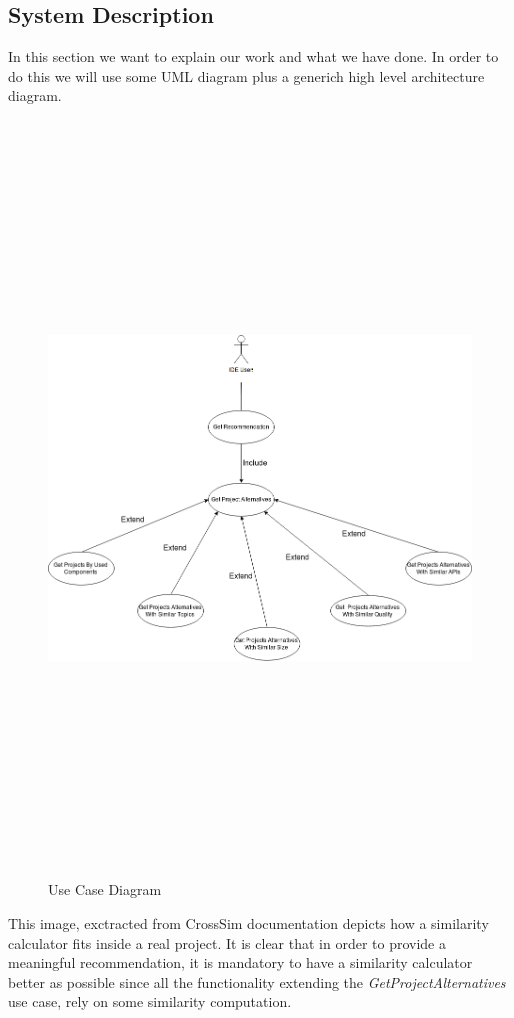 \subsection{System Description}
In this section we want to explain our work and what we have done. In order to do this we will use some UML diagram plus a generich high level architecture diagram.
\begin{figure}[H]
	\includegraphics[width=15cm,height=20cm,keepaspectratio]{images/UseCaseDiagram.png}
	\caption{Use Case Diagram}
	\label{fig:UseCase}
\end{figure}
This image, exctracted from CrossSim documentation depicts how a similarity calculator fits inside a real project.
It is clear that in order to provide a meaningful recommendation, it is mandatory to have a similarity calculator better as possible since all the functionality extending the \emph{GetProjectAlternatives} use case, rely on some similarity computation.

